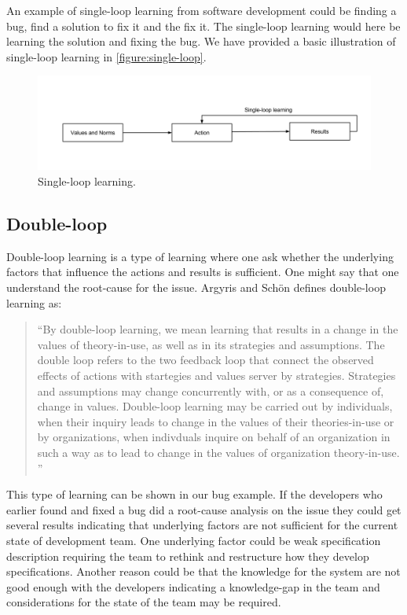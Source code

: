 An example of single-loop learning from software development could be finding a bug, find a solution to fix it and the fix it. The single-loop learning would here be learning the solution and fixing the bug. We have provided a basic illustration of single-loop learning in \autoref{figure:single-loop}.

\begin{figure}[!h]
	\centering
	\includegraphics[width=\textwidth, keepaspectratio]{figures/Single-loop.png}
	\caption{Single-loop learning.}
	\label{figure:single-loop}
\end{figure}

\subsection{Double-loop} %
\label{sub:double_loop}
Double-loop learning is a type of learning where one ask whether the underlying factors that influence the actions and results is sufficient.
One might say that one understand the root-cause for the issue. 
Argyris and Schön defines double-loop learning as: 

\begin{quote}
``By double-loop learning, we mean learning that results in a change in the values of theory-in-use, as well as in its strategies and assumptions. The double loop refers to the two feedback loop that connect the observed effects of actions with startegies and values server by strategies. Strategies and assumptions may change concurrently with, or as a consequence of, change in values. Double-loop learning may be carried out by individuals, when their inquiry leads to change in the values of their theories-in-use or by organizations, when indivduals inquire on behalf of an organization in such a way as to lead to change in the values of organization theory-in-use. ''
\end{quote}

This type of learning can be shown in our bug example. If the developers who earlier found and fixed a bug did a root-cause analysis on the issue they could get several results indicating that underlying factors are not sufficient for the current state of development team. One underlying factor could be weak specification description requiring the team to rethink and restructure how they develop specifications. Another reason could be that the knowledge for the system are not good enough with the developers indicating a knowledge-gap in the team and considerations for the state of the team may be required. 

